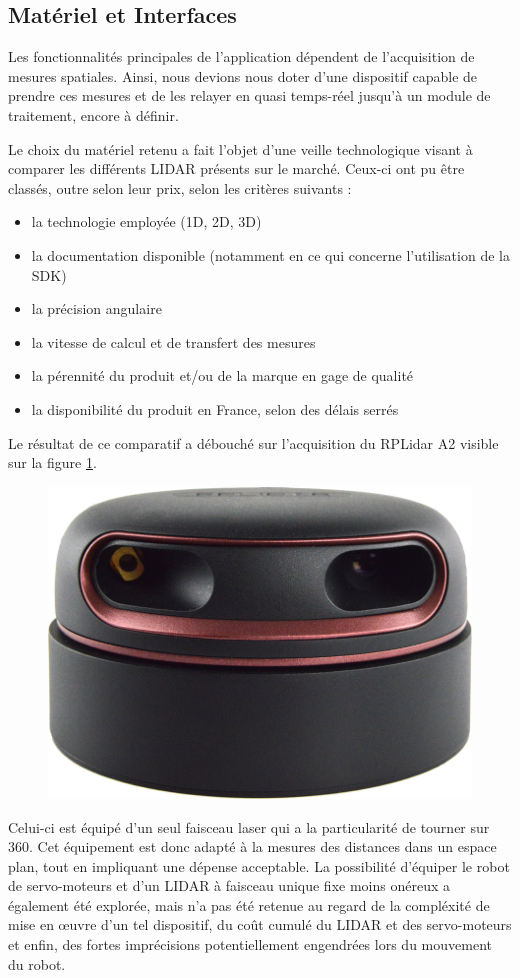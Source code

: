   \subsection{Matériel et Interfaces}
  \label{subsec:archi-physique}
  
Les fonctionnalités principales de l'application dépendent de l'acquisition de mesures spatiales. 
Ainsi, nous devions nous doter d'une dispositif capable de prendre ces mesures et de les relayer en quasi temps-réel jusqu'à un module de traitement, encore à définir. 

Le choix du matériel retenu a fait l'objet d'une veille technologique visant à comparer les différents \gls{LIDAR} présents sur le marché. 
Ceux-ci ont pu être classés, outre selon leur prix, selon les critères suivants : 

\begin{itemize}
  \item la technologie employée (1D, 2D, 3D)
  \item la documentation disponible (notamment en ce qui concerne l'utilisation de la \gls{SDK})
  \item la précision angulaire
  \item la vitesse de calcul et de transfert des mesures
  \item la pérennité du produit et/ou de la marque en gage de qualité
  \item la disponibilité du produit en France, selon des délais serrés
\end{itemize}

Le résultat de ce comparatif a débouché sur l'acquisition du RPLidar A2 visible sur la figure \ref{fig:rplidar}.

\begin{figure}[h]
  \centering
    \includegraphics[width=.2\linewidth]{figures/rplidar_a2}  
  \label{fig:rplidar}
\end{figure}

Celui-ci est équipé d'un seul faisceau laser qui a la particularité de tourner sur 360\degre. 
Cet équipement est donc adapté à la mesures des distances dans un espace plan, tout en impliquant une dépense acceptable. 
La possibilité d'équiper le robot de servo-moteurs et d'un LIDAR à faisceau unique fixe moins onéreux a également été explorée, mais n'a pas été retenue au regard de la compléxité de mise en \oe{}uvre d'un tel dispositif, 
du coût cumulé du LIDAR et des servo-moteurs et enfin, des fortes imprécisions potentiellement engendrées lors du mouvement du robot. 

